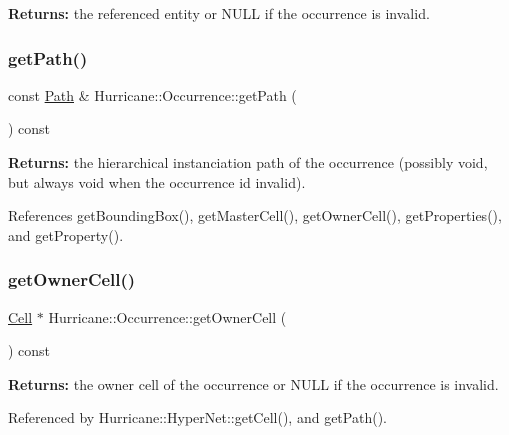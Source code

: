 {\bfseries Returns\+:} the referenced entity or N\+U\+LL if the occurrence is invalid. \mbox{\label{classHurricane_1_1Occurrence_adeab556806a83e8cf3ad6ecc08f3a83e}} 
\subsubsection{\texorpdfstring{get\+Path()}{getPath()}}
{\footnotesize\ttfamily const \hyperlink{classHurricane_1_1Path}{Path} \& Hurricane\+::\+Occurrence\+::get\+Path (\begin{DoxyParamCaption}{ }\end{DoxyParamCaption}) const\hspace{0.3cm}{\ttfamily [inline]}}

{\bfseries Returns\+:} the hierarchical instanciation path of the occurrence (possibly void, but always void when the occurrence id invalid). 

References get\+Bounding\+Box(), get\+Master\+Cell(), get\+Owner\+Cell(), get\+Properties(), and get\+Property().

\mbox{\label{classHurricane_1_1Occurrence_affced95f35617150b5811c3784b20d93}} 
\subsubsection{\texorpdfstring{get\+Owner\+Cell()}{getOwnerCell()}}
{\footnotesize\ttfamily \hyperlink{classHurricane_1_1Cell}{Cell} $\ast$ Hurricane\+::\+Occurrence\+::get\+Owner\+Cell (\begin{DoxyParamCaption}{ }\end{DoxyParamCaption}) const}

{\bfseries Returns\+:} the owner cell of the occurrence or N\+U\+LL if the occurrence is invalid. 

Referenced by Hurricane\+::\+Hyper\+Net\+::get\+Cell(), and get\+Path().

\mbox{\label{classHurricane_1_1Occurrence_a5caeab69e23907909b3deb60ff26df15}} 
